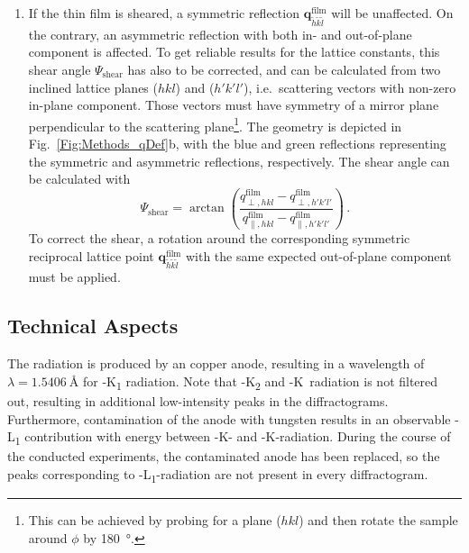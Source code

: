 \begin{enumerate}
    \item If the thin film is sheared, a symmetric reflection $\mathbf{q}_{\tilde{h}\tilde{k}\tilde{l}}^\mathrm{film}$ will be unaffected.
    On the contrary, an asymmetric reflection with both in- and out-of-plane component is affected.
    To get reliable results for the lattice constants, this shear angle $\Psi_\mathrm{shear}$ has also to be corrected, and can be calculated from two inclined lattice planes ($hkl$) and ($h'k'l'$), i.e.\ scattering vectors with non-zero in-plane component.
    Those vectors must have symmetry of a mirror plane perpendicular to the scattering plane\footnote{
        This can be achieved by probing for a plane ($hkl$) and then rotate the sample around $\phi$ by \qty{180}{\degree}.
    }.
    The geometry is depicted in Fig.~\ref{Fig:Methods_qDef}b, with the blue and green reflections representing the symmetric and asymmetric reflections, respectively.
    The shear angle can be calculated with
    \begin{equation}
        \Psi_\mathrm{shear}=\arctan\left(\frac{
            q_{\perp,hkl}^\mathrm{film}
            -q_{\perp,h'k'l'}^\mathrm{film}
        }{
            q_{\parallel,hkl}^\mathrm{film}
            -q_{\parallel,h'k'l'}^\mathrm{film}
        }\right)\,.
    \end{equation}
    To correct the shear, a rotation around the corresponding symmetric reciprocal lattice point $\mathbf{q}_{\tilde{h}\tilde{k}\tilde{l}}^\mathrm{film}$ with the same expected out-of-plane component must be applied.
\end{enumerate}

\subsection{Technical Aspects}
The radiation is produced by an copper anode, resulting in a wavelength of $\lambda=\qty{1.5406}{\angstrom}$ for -K\textalpha\textsubscript{1} radiation.
Note that -K\textalpha\textsubscript{2} and -K\textbeta\ radiation is not filtered out, resulting in additional low-intensity peaks in the diffractograms.
Furthermore, contamination of the anode with tungsten results in an observable -L\textalpha\textsubscript{1} contribution with energy between -K\textalpha- and -K\textbeta-radiation.
During the course of the conducted experiments, the contaminated anode has been replaced, so the peaks corresponding to -L\textalpha\textsubscript{1}-radiation are not present in every diffractogram.

